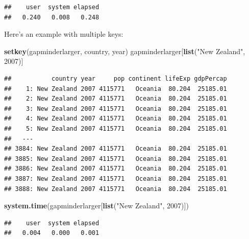 \documentclass[]{article}
\newenvironment{Shaded}{\begin{snugshade}}{\end{snugshade}}
\newcommand{\KeywordTok}[1]{\textcolor[rgb]{0.13,0.29,0.53}{\textbf{{#1}}}}
\newcommand{\DecValTok}[1]{\textcolor[rgb]{0.00,0.00,0.81}{{#1}}}
\newcommand{\StringTok}[1]{\textcolor[rgb]{0.31,0.60,0.02}{{#1}}}
\newcommand{\NormalTok}[1]{{#1}}
\begin{document}
\begin{verbatim}
##    user  system elapsed 
##   0.240   0.008   0.248
\end{verbatim}

Here's an example with multiple keys:

\begin{Shaded}
\begin{Highlighting}[]
\KeywordTok{setkey}\NormalTok{(gapminderlarger, country, year)}
\NormalTok{gapminderlarger[}\KeywordTok{list}\NormalTok{(}\StringTok{"New Zealand"}\NormalTok{, }\DecValTok{2007}\NormalTok{)]}
\end{Highlighting}
\end{Shaded}

\begin{verbatim}
##           country year     pop continent lifeExp gdpPercap
##    1: New Zealand 2007 4115771   Oceania  80.204  25185.01
##    2: New Zealand 2007 4115771   Oceania  80.204  25185.01
##    3: New Zealand 2007 4115771   Oceania  80.204  25185.01
##    4: New Zealand 2007 4115771   Oceania  80.204  25185.01
##    5: New Zealand 2007 4115771   Oceania  80.204  25185.01
##   ---                                                     
## 3884: New Zealand 2007 4115771   Oceania  80.204  25185.01
## 3885: New Zealand 2007 4115771   Oceania  80.204  25185.01
## 3886: New Zealand 2007 4115771   Oceania  80.204  25185.01
## 3887: New Zealand 2007 4115771   Oceania  80.204  25185.01
## 3888: New Zealand 2007 4115771   Oceania  80.204  25185.01
\end{verbatim}

\begin{Shaded}
\begin{Highlighting}[]
\KeywordTok{system.time}\NormalTok{(gapminderlarger[}\KeywordTok{list}\NormalTok{(}\StringTok{"New Zealand"}\NormalTok{, }\DecValTok{2007}\NormalTok{)])}
\end{Highlighting}
\end{Shaded}

\begin{verbatim}
##    user  system elapsed 
##   0.004   0.000   0.001
\end{verbatim}

\begin{Shaded}
\end{Shaded}
\end{document}

